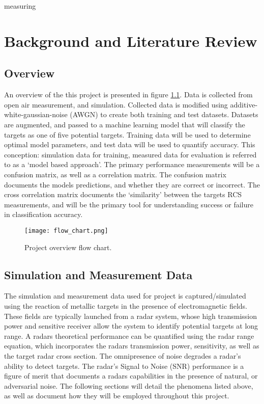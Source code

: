 measuring\chapter{Background and Literature Review}
\label{ch:background}
\glsresetall

\section{Overview}

An overview of the this project is presented in figure \ref{fig:overview}. Data is collected from open air measurement, and simulation. Collected data is modified using additive-white-gaussian-noise (AWGN) to create both training and test datasets. Datasets are augmented, and passed to a machine learning model that will classify the targets as one of five potential targets. Training data will be used to determine optimal model parameters, and test data will be used to quantify accuracy. This conception: simulation data for training, measured data for evaluation is referred to as a `model based approach'. The primary performance measurements will be a confusion matrix, as well as a correlation matrix. The confusion matrix documents the models predictions, and whether they are correct or incorrect. The cross correlation matrix documents the `similarity' between the targets RCS measurements, and will be the primary tool for understanding success or failure in classification accuracy.

\begin{figure}[htbp]
	\centering
	 \texttt{[image: flow\_chart.png]}
	\caption[Project Overview]{Project overview flow chart.}
	\label{fig:overview}
\end{figure}

\section{Simulation and Measurement Data}

The simulation and measurement data used for project is captured/simulated using the reaction of metallic targets in the presence of electromagnetic fields. These fields are typically launched from a radar system, whose high transmission power and sensitive receiver allow the system to identify potential targets at long range. A radars theoretical performance can be quantified using the radar range equation, which incorporates the radars transmission power, sensitivity, as well as the target radar cross section. The omnipresence of noise degrades a radar's ability to detect targets. The radar's Signal to Noise (SNR) performance is a figure of merit that documents a radars capabilities in the presence of natural, or adversarial noise. The following sections will detail the phenomena listed above, as well as document how they will be employed throughout this project.

